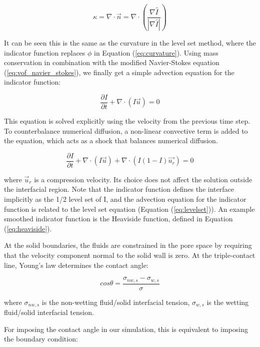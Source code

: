 \begin{equation}
\kappa = \nabla\cdot\vec{n} = \nabla\cdot\left(\frac{\nabla\hat{I}}{|\nabla\hat{I}|}\right) 
\end{equation}

It can be seen this is the same as the curvature in the level set method, where the indicator function replaces $\phi$ in Equation (\ref{eq:curvature}).
Using mass conservation in combination with the modified Navier-Stokes equation (\ref{eq:vof_navier_stokes}), we finally get a simple advection equation for the indicator function:


\begin{equation}
\frac{\partial I}{\partial t} + \nabla \cdot (I\vec{u}) = 0
\label{eq:vof_advection}
\end{equation}

This equation is solved explicitly using the velocity from the previous time step. To counterbalance numerical diffusion, a non-linear convective term is added to the equation, which acts as a shock that balances numerical diffusion.

\begin{equation}
\frac{\partial I}{\partial t} + \nabla \cdot (I\vec{u}) + \nabla \cdot (I(1-I)\vec{u_r}) = 0
\label{eq:vof_advection_modified}
\end{equation}

where $\vec{u}_r$ is a compression velocity. Its choice does not affect the solution outside the interfacial region. Note that the indicator function defines the interface implicitly as the 1/2 level set of I, and the advection equation for the indicator function is related to the level set equation (Equation (\ref{eq:levelset})). An example smoothed indicator function is the Heaviside function, defined in Equation (\ref{eq:heaviside}).

At the solid boundaries, the fluids are constrained in the pore space by requiring that the velocity component normal to the solid wall is zero. At the triple-contact line, Young's law determines the contact angle:

\begin{equation}
cos \theta = \frac{\sigma_{nw,s}-\sigma_{w,s}}{\sigma}
\end{equation}

where $\sigma_{nw,s}$ is the non-wetting fluid/solid interfacial tension, $\sigma_{w,s}$ is the wetting fluid/solid interfacial tension.

For imposing the contact angle in our simulation, this is equivalent to imposing the boundary condition:

